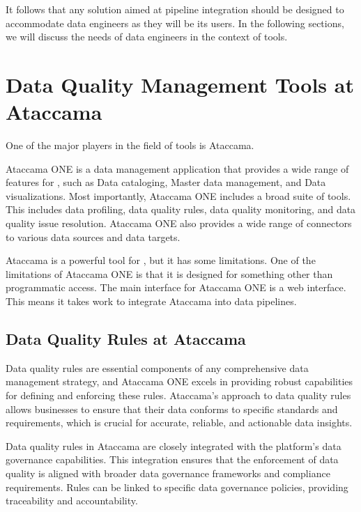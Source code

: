  It follows that any solution aimed at pipeline integration should be designed to accommodate data engineers as they will be its users. In the following sections, we will discuss the needs of data engineers in the context of  tools.

\section{Data Quality Management Tools at Ataccama}

One of the major players in the field of  tools is Ataccama. \cite{ataccama_gartner}

Ataccama ONE is a data management application that provides a wide range of features for , such as Data cataloging, Master data management, and Data visualizations. Most importantly, Ataccama ONE includes a broad suite of  tools. This includes data profiling, data quality rules, data quality monitoring, and data quality issue resolution. Ataccama ONE also provides a wide range of connectors to various data sources and data targets. \cite{ataccama_ONE}

Ataccama is a powerful tool for , but it has some limitations. One of the limitations of Ataccama ONE is that it is designed for something other than programmatic access. The main interface for Ataccama ONE is a web interface. This means it takes work to integrate Ataccama into data pipelines.

\subsection{Data Quality Rules at Ataccama}

Data quality rules are essential components of any comprehensive data management strategy, and Ataccama ONE excels in providing robust capabilities for defining and enforcing these rules. Ataccama's approach to data quality rules allows businesses to ensure that their data conforms to specific standards and requirements, which is crucial for accurate, reliable, and actionable data insights.

Data quality rules in Ataccama are closely integrated with the platform's data governance capabilities. This integration ensures that the enforcement of data quality is aligned with broader data governance frameworks and compliance requirements. Rules can be linked to specific data governance policies, providing traceability and accountability.

